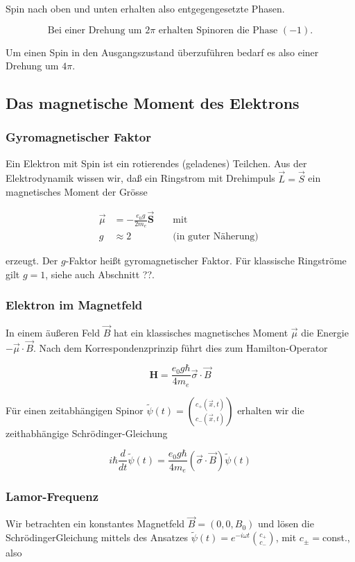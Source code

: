 \documentclass[10pt, letterpaper]{article}
\begin{document}
Spin nach oben und unten erhalten also entgegengesetzte Phasen.

$$
\text { Bei einer Drehung um } 2 \pi \text { erhalten Spinoren die Phase }(-1) \text {. }
$$

Um einen Spin in den Ausgangszustand überzuführen bedarf es also einer Drehung um $4 \pi$.

\subsection*{Das magnetische Moment des Elektrons}
\subsubsection*{Gyromagnetischer Faktor}
Ein Elektron mit Spin ist ein rotierendes (geladenes) Teilchen. Aus der Elektrodynamik wissen wir, daß ein Ringstrom mit Drehimpuls $\vec{L}=\vec{S}$ ein magnetisches Moment der Grösse

$$
\begin{aligned}
\vec{\mu} & =-\frac{e_{0} g}{2 m_{e}} \overrightarrow{\mathbf{S}} & & \text { mit } \\
g & \approx 2 & & \text { (in guter Näherung) }
\end{aligned}
$$

erzeugt. Der $g$-Faktor heißt gyromagnetischer Faktor. Für klassische Ringströme gilt $g=1$, siehe auch Abschnitt ??.

\subsubsection*{Elektron im Magnetfeld}
In einem äußeren Feld $\vec{B}$ hat ein klassisches magnetisches Moment $\vec{\mu}$ die Energie $-\vec{\mu} \cdot \vec{B}$. Nach dem Korrespondenzprinzip führt dies zum Hamilton-Operator

$$
\mathbf{H}=\frac{e_{0} g \hbar}{4 m_{e}} \vec{\sigma} \cdot \vec{B}
$$

Für einen zeitabhängigen Spinor $\tilde{\psi}(t)=\binom{c_{+}(\vec{x}, t)}{c_{-}(\vec{x}, t)}$ erhalten wir die zeithabhängige Schrödinger-Gleichung

$$
i \hbar \frac{d}{d t} \tilde{\psi}(t)=\frac{e_{0} g \hbar}{4 m_{e}}(\vec{\sigma} \cdot \vec{B}) \tilde{\psi}(t)
$$

\subsubsection*{Lamor-Frequenz}
Wir betrachten ein konstantes Magnetfeld $\vec{B}=\left(0,0, B_{0}\right)$ und lösen die SchrödingerGleichung mittels des Ansatzes $\tilde{\psi}(t)=e^{-i \omega t}\binom{c_{+}}{c_{-}}$, mit $c_{ \pm}=$const., also
\end{document}
